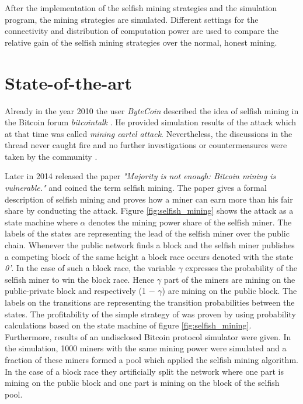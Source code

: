 \documentclass{scrartcl}
\begin{document}
After the implementation of the selfish mining strategies and the simulation program, the mining strategies are simulated.
Different settings for the connectivity and distribution of computation power are used to compare the relative gain of the selfish mining strategies over the normal, honest mining.

\section{State-of-the-art}
Already in the year 2010 the user \textit{ByteCoin} described the idea of selfish mining in the Bitcoin forum \textit{bitcointalk} \cite{ByteCoin2010}.
He provided simulation results of the attack which at that time was called \textit{mining cartel attack}.
Nevertheless, the discussions in the thread never caught fire and no further investigations or countermeasures were taken by the community \cite{BitcoinTalk2010, bahack2013theoretical}.

Later in 2014 \citeauthor{eyal2014majority} released the paper \textit{"Majority is not enough: Bitcoin mining is vulnerable."} and coined the term selfish mining.
The paper gives a formal description of selfish mining and proves how a miner can earn more than his fair share by conducting the attack.
Figure \ref{fig:selfish_mining} shows the attack as a state machine where $\alpha$ denotes the mining power share of the selfish miner.
The labels of the states are representing the lead of the selfish miner over the public chain.
Whenever the public network finds a block and the selfish miner publishes a competing block of the same height a block race occurs denoted with the state \textit{0'}.
In the case of such a block race, the variable $\gamma$ expresses the probability of the selfish miner to win the block race.
Hence $\gamma$ part of the miners are mining on the public-private block and respectively (1 − $\gamma$) are mining on the public block.
The labels on the transitions are representing the transition probabilities between the states.
The profitability of the simple strategy of \cite{eyal2014majority} was proven by using probability calculations based on the state machine of figure \ref{fig:selfish_mining}.
Furthermore, results of an undisclosed Bitcoin protocol simulator were given.
In the simulation, 1000 miners with the same mining power were simulated and a fraction of these miners formed a pool which applied the selfish mining algorithm.
In the case of a block race they artificially split the network where one part is mining on the public block and one part is mining on the block of the selfish pool.
\end{document}
